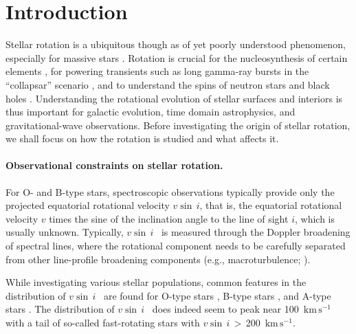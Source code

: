 \documentclass{aa}
\newcommand{\kms}{$\mathrm{km\,s^{-1}}$}
\newcommand{\vsini} {$v\sin\,i$}
\begin{document}

\maketitle
%
\section{Introduction}


Stellar rotation is a ubiquitous though as of yet poorly understood
phenomenon, especially for massive stars \cite[e.g.,][]{Langer_2012}.
Rotation is crucial for the nucleosynthesis of certain elements
\citep[e.g., ``s process''][]{limongi:18}, for powering transients
such as long gamma-ray bursts in the ``collapsar'' scenario
\citep[e.g.,][]{macfadyen:99}, and to understand the spins of neutron
stars and black holes \citep[e.g.,][]{callister:21, GWTC3}.
Understanding the rotational evolution of stellar surfaces and
interiors is thus important for galactic evolution, time domain astrophysics, and
gravitational-wave observations. Before investigating the origin of stellar
rotation, we shall focus on how the rotation is
studied and what affects it.

\paragraph{Observational constraints on stellar rotation.}
For O- and B-type stars, spectroscopic observations typically provide only the projected
  equatorial rotational velocity \vsini, that is, the equatorial rotational
  velocity $v$ times the sine of the inclination angle to the line of
  sight $i$, which is usually unknown.
Typically, \vsini~ is measured through the Doppler broadening of spectral
lines, where the rotational component needs to be carefully separated
from other line-profile broadening components (e.g., macroturbulence; \citealt{Simon-Diaz2014}).

While investigating various stellar populations, common features in
the distribution of \vsini~ are found for O-type stars
\citep{Conti_1977, vfts_2013_otype, vfts_2015_otype}, B-type
stars \citep{Wolff_1982, Dufton_2013}, and A-type stars \citep{Abt_1973}.
The distribution of \vsini~ does indeed seem to peak near 100~\kms~ with
a tail of so-called fast-rotating stars with \vsini\,$>$\,200~\kms.
\end{document}

